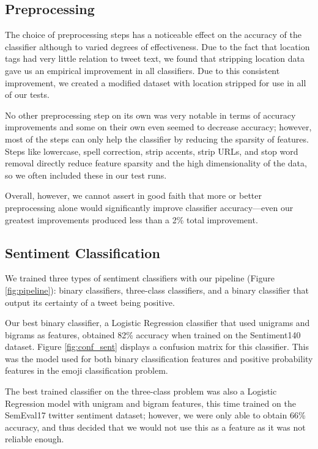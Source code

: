 \documentclass[11pt]{article}
\begin{document}
\subsection{Preprocessing}

The choice of preprocessing steps has a noticeable effect on the accuracy of the classifier although to varied degrees of effectiveness. Due to the fact that location tags had very little relation to tweet text, we found that stripping location data gave us an empirical improvement in all classifiers. Due to this consistent improvement, we created a modified dataset with location stripped for use in all of our tests.

No other preprocessing step on its own was very notable in terms of accuracy improvements and some on their own even seemed to decrease accuracy; however, most of the steps can only help the classifier by reducing the sparsity of features.  Steps like lowercase, spell correction, strip accents, strip URLs, and stop word removal directly reduce feature sparsity and the high dimensionality of the data, so we often included these in our test runs. 

Overall, however, we cannot assert in good faith that more or better preprocessing alone would significantly improve classifier accuracy—even our greatest improvements produced less than a 2\% total improvement.

\subsection{Sentiment Classification}

We trained three types of sentiment classifiers with our pipeline (Figure \ref{fig:pipeline}): binary classifiers, three-class classifiers, and a binary classifier that output its certainty of a tweet being positive. 

Our best binary classifier, a Logistic Regression classifier that used unigrams and bigrams as features, obtained 82\% accuracy when trained on the Sentiment140 dataset. Figure \ref{fig:conf_sent} displays a confusion matrix for this classifier. This was the model used for both binary classification features and positive probability features in the emoji classification problem.

The best trained classifier on the three-class problem was also a Logistic Regression model with unigram and bigram features, this time trained on the SemEval17 twitter sentiment dataset; however, we were only able to obtain 66\% accuracy, and thus decided that we would not use this as a feature as it was not reliable enough.
\end{document}
